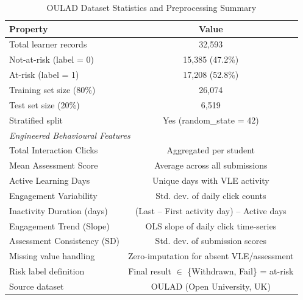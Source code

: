 \begin{table}[!t]
  \renewcommand{\arraystretch}{1.25}
  \caption{OULAD Dataset Statistics and Preprocessing Summary}
  \label{tab:dataset}
  \centering
  \begin{tabular}{lc}
    \hline
    \textbf{Property} & \textbf{Value} \\
    \hline
    Total learner records & 32,593 \\
    Not-at-risk (label = 0) & 15,385 (47.2\%) \\
    At-risk (label = 1) & 17,208 (52.8\%) \\
    Training set size (80\%) & 26,074 \\
    Test set size (20\%) & 6,519 \\
    Stratified split & Yes (random\_state = 42) \\
    \hline
    \multicolumn{2}{l}{\textit{Engineered Behavioural Features}} \\
    \hline
    Total Interaction Clicks & Aggregated per student \\
    Mean Assessment Score & Average across all submissions \\
    Active Learning Days & Unique days with VLE activity \\
    Engagement Variability & Std. dev. of daily click counts \\
    Inactivity Duration (days) & (Last – First activity day) – Active days \\
    Engagement Trend (Slope) & OLS slope of daily click time-series \\
    Assessment Consistency (SD) & Std. dev. of submission scores \\
    \hline
    Missing value handling & Zero-imputation for absent VLE/assessment \\
    Risk label definition & Final result $\in$ \{Withdrawn, Fail\} = at-risk \\
    Source dataset & OULAD (Open University, UK) \cite{kuzilek2017open} \\
    \hline
  \end{tabular}
\end{table}



